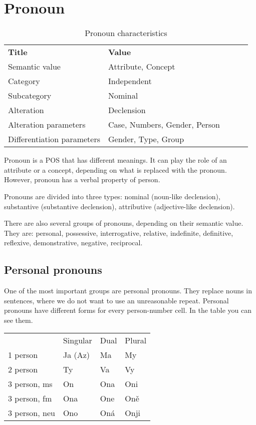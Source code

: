 \section{Pronoun}

\begin{table}[h]
	\caption{Pronoun characteristics}
	\begin{tabular}{lllll}
		\textbf{Title}              & \textbf{Value}               \\
		Semantic value              & Attribute, Concept           \\
		Category                    & Independent                  \\
		Subcategory                 & Nominal                      \\
		Alteration                  & Declension                   \\
		Alteration parameters       & Case, Numbers, Gender, Person\\
		Differentiation parameters  & Gender, Type, Group
	\end{tabular}
\end{table}

Pronoun is a POS that has different meanings. It can play the role of an attribute or a concept, depending on what is replaced with the pronoun. However, pronoun has a verbal property of person.

Pronouns are divided into three types: nominal (noun-like declension), substantive (substantive declension), attributive (adjective-like declension).

There are also several groups of pronouns, depending on their semantic value. They are: personal, possessive, interrogative, relative, indefinite, definitive, reflexive, demonstrative, negative, reciprocal.

\subsection{Personal pronouns}

One of the most important groups are personal pronouns. They replace nouns in sentences, where we do not want to use an unreasonable repeat. Personal pronouns have different forms for every person-number cell. In the table you can see them.

\begin{table}
	\begin{tabular}{llll}
		& Singular & Dual & Plural \\
		1 person & Ja (Az) & Ma & My \\
		2 person & Ty & Va & Vy \\
		3 person, ms & On & Ona & Oni \\
		3 person, fm & Ona & One & Oně \\
		3 person, neu & Ono & Oná & Onji
	\end{tabular}
\end{table}

